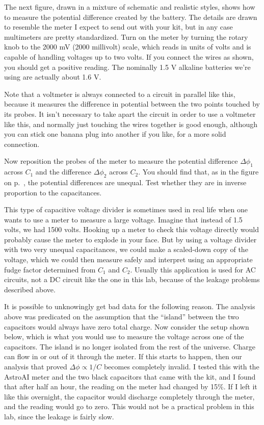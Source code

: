 The next figure, drawn in a mixture of schematic and realistic styles,
shows how to measure the potential difference created by the
battery. The details are drawn to resemble the meter I expect to send out with
your kit, but in any case multimeters are pretty standardized. Turn on the
meter by turning the rotary knob to the 2000 mV (2000 millivolt) scale, which reads in units of
volts and is capable of handling voltages up to two volts. If you connect the wires
as shown, you should get a positive reading. The nominally 1.5 V alkaline batteries
we're using are actually about 1.6 V.


Note that a voltmeter is always connected to a circuit in parallel like this,
because it measures the difference in potential between the two points touched
by its probes. It isn't necessary to take apart the circuit in order to use
a voltmeter like this, and normally just touching the wires together is good
enough, although you can stick one banana plug into another if you like, for
a more solid connection.

Now reposition the probes of the meter to measure the potential difference
$\Delta\phi_1$ across $C_1$ and the difference $\Delta\phi_2$ across $C_2$.
You should find that, as in the  figure on p.~\pageref{fig:em-fie-covid-capacitor-params}, the potential
differences are unequal. Test whether they are in inverse proportion to the capacitances.

This type of capacitive voltage divider is sometimes used in real life when
one wants to use a meter to measure a large voltage. Imagine that instead of
1.5 volts, we had 1500 volts. Hooking up a meter to check this voltage directly would probably cause
the meter to explode in your face. But by using a voltage divider with two very
unequal capacitances, we could make a scaled-down copy of the voltage, which we
could then measure safely and interpret using an appropriate fudge factor determined from $C_1$ and $C_2$.
Usually this application is used for AC circuits, not a DC circuit
like the one in this lab, because of the leakage problems described above.

It is possible to unknowingly get bad data for the following reason. The analysis above
was predicated on the assumption that the ``island'' between the two capacitors would
always have zero total charge. Now consider the setup shown below, which is what you
would use to measure the voltage across one of the capacitors. The island is no longer
isolated from the rest of the universe. Charge can flow in or out of it through the
meter. If this starts to happen, then our analysis that proved $\Delta\phi \propto 1/C$ becomes
completely invalid. I tested this with the AstroAI meter and the two black capacitors
that came with the kit, and I found that after half an hour, the reading on the meter had
changed by 15\%. If I left it like this overnight, the capacitor would discharge completely
through the meter, and the reading would go to zero. This would not be a practical problem in 
this lab, since the leakage is fairly slow. 

